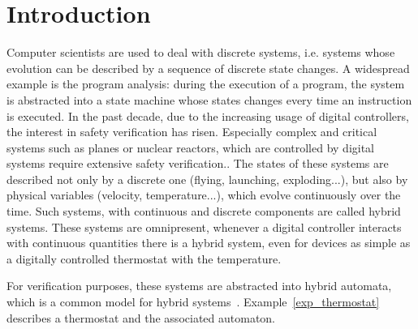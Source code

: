 \section{Introduction}
Computer scientists are used to deal with discrete systems, i.e. systems whose evolution can be described by a sequence of discrete state changes. A widespread example is the program analysis: during the execution of a program, the system is abstracted into a state machine whose states changes every time an instruction is executed.
In the past decade, due to the increasing usage of digital controllers, the interest in safety verification has risen. Especially complex and critical systems such as planes or nuclear reactors, which are controlled by digital systems require extensive safety verification.. The states of these systems are described not only by a discrete one (flying, launching, exploding...), but also by physical variables (velocity, temperature...), which evolve continuously over the time. Such systems, with continuous and discrete components are called hybrid systems. These systems are omnipresent, whenever a digital controller interacts with continuous quantities there is a hybrid system, even for devices as simple as a digitally controlled thermostat with the temperature.

For verification purposes, these systems are abstracted into hybrid automata, which is a common model for hybrid systems~\cite{colas}. Example~\ref{exp_thermostat} describes a thermostat and the associated automaton.

